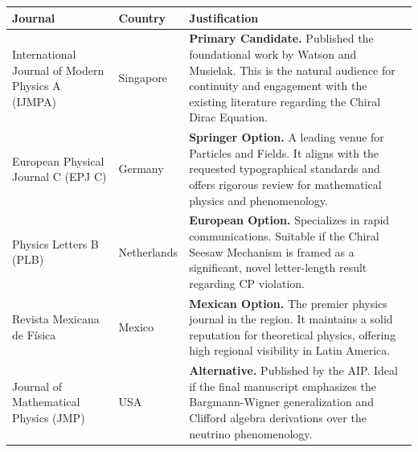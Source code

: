 \documentclass[varwidth=18cm, border=10pt]{standalone}
\begin{document}
\begin{tabular}{@{} p{4.2cm} p{2.0cm} p{10cm} @{}}
    \toprule
    \textbf{Journal} & \textbf{Country} & \textbf{Justification} \\
    \midrule

    International Journal of Modern Physics A (IJMPA) &
    Singapore &
    \textbf{Primary Candidate.} Published the foundational work by Watson and Musielak. This is the natural audience for continuity and engagement with the existing literature regarding the Chiral Dirac Equation. \\
    \addlinespace

    European Physical Journal C (EPJ C) &
    Germany &
    \textbf{Springer Option.} A leading venue for Particles and Fields. It aligns with the requested typographical standards and offers rigorous review for mathematical physics and phenomenology. \\
    \addlinespace

    Physics Letters B \newline (PLB) &
    Netherlands &
    \textbf{European Option.} Specializes in rapid communications. Suitable if the Chiral Seesaw Mechanism is framed as a significant, novel letter-length result regarding CP violation. \\
    \addlinespace

    Revista Mexicana de F\'{i}sica &
    Mexico &
    \textbf{Mexican Option.} The premier physics journal in the region. It maintains a solid reputation for theoretical physics, offering high regional visibility in Latin America. \\
    \addlinespace

    Journal of Mathematical Physics (JMP) &
    USA &
    \textbf{Alternative.} Published by the AIP. Ideal if the final manuscript emphasizes the Bargmann-Wigner generalization and Clifford algebra derivations over the neutrino phenomenology. \\

    \bottomrule
\end{tabular}
\end{document}
